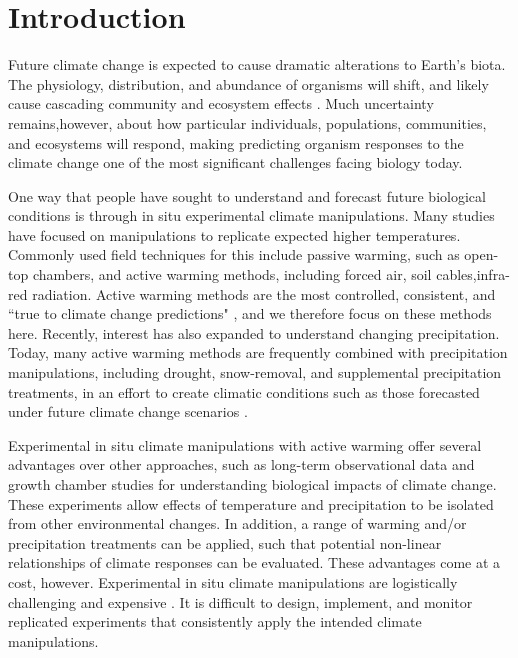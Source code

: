 \documentclass{article}
\begin{document}
\section* {Introduction}
\par Future climate change is expected to cause dramatic alterations to Earth's biota. The physiology, distribution, and abundance of organisms will shift, and likely cause cascading community and ecosystem effects \citep{thomas2004,parmesan2006,sheldon2011,urban2012}. Much uncertainty remains,however, about how particular individuals, populations, communities, and ecosystems will respond, making predicting organism responses to the climate change one of the most significant challenges facing biology today.
\par One way that people have sought to understand and forecast future biological conditions is through in situ experimental climate manipulations. Many studies have focused on manipulations to replicate expected higher temperatures. Commonly used field techniques for this include passive warming, such as open-top chambers, and active warming methods, including forced air, soil cables,infra-red radiation. Active warming methods are the most controlled, consistent, and ``true to climate change predictions" \citep{kimball2005,kimball2008,aronson2009,wolkovich2012}, and we therefore focus on these methods here. Recently, interest has also expanded to understand changing precipitation. Today, many active warming methods are frequently combined with precipitation manipulations, including drought, snow-removal, and supplemental precipitation treatments, in an effort to create climatic conditions such as those forecasted under future climate change scenarios \citep{price1998,cleland2006,sherry2007,rollinson2012}.
\par Experimental in situ climate manipulations with active warming offer several advantages over other approaches, such as long-term observational data and growth chamber studies for understanding biological impacts of climate change. These experiments allow effects of temperature and precipitation to be isolated from other environmental changes. In addition, a range of warming and/or precipitation treatments can be applied, such that potential non-linear relationships of climate responses can be evaluated. These advantages come at a cost, however. Experimental in situ climate manipulations are logistically challenging and expensive \citep{aronson2009}. It is difficult to design, implement, and monitor replicated experiments that consistently apply the intended climate manipulations.  
\end{document}
